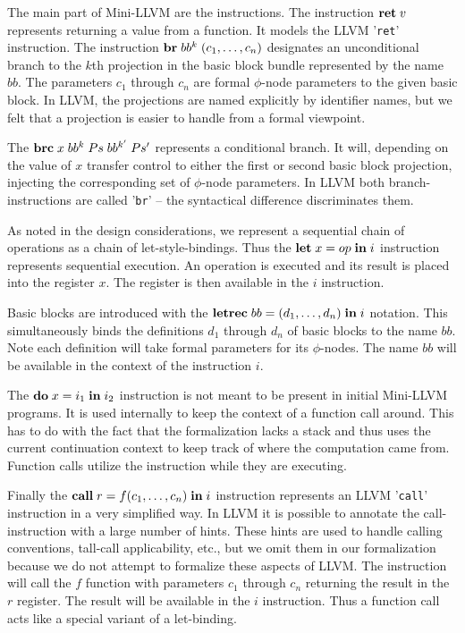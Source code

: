 \documentclass[a4paper, oneside, 10pt, draft]{memoir}
\begin{document}
The main part of Mini-LLVM are the instructions. The instruction
$\mathbf{ret} \; v$ represents returning a value from a function. It models the
LLVM '\texttt{ret}' instruction. The instruction $\mathbf{br} \; bb^k \; (c_1,
  \dotsc, c_n)$ designates an unconditional branch to the $k$th
projection in the basic block bundle represented by the name $bb$. The
parameters $c_1$ through $c_n$ are formal $\phi$-node parameters to
the given basic block. In LLVM, the projections are named explicitly
by identifier names, but we felt that a projection is easier to handle
from a formal viewpoint.

The $\mathbf{brc} \; x \; bb^k \; Ps \; bb^{k'} \; Ps'$ represents a conditional
branch. It will, depending on the value of $x$ transfer control to
either the first or second basic block projection, injecting the
corresponding set of $\phi$-node parameters. In LLVM both
branch-instructions are called '\texttt{br}' -- the syntactical
difference discriminates them.

As noted in the design considerations, we represent a sequential chain
of operations as a chain of let-style-bindings. Thus the
$\mathbf{let} \; x = op \; \mathbf{in} \; i$ instruction represents sequential execution. An
operation is executed and its result is placed into the register
$x$. The register is then available in the $i$ instruction.

Basic blocks are introduced with the $\mathbf{letrec} \; bb = (d_1, \dotsc,
  d_n) \; \mathbf{in} \; i$ notation. This simultaneously binds the definitions $d_1$
through $d_n$ of basic blocks to the name $bb$. Note each definition will
take formal parameters for its $\phi$-nodes. The name $bb$ will be
available in the context of the instruction $i$.

The $\mathbf{do} \; x = i_1 \; \mathbf{in} \; i_2$ instruction is not meant to be present in
initial Mini-LLVM programs. It is used internally to keep the context
of a function call around. This has to do with the fact that the
formalization lacks a stack and thus uses the current continuation
context to keep track of where the computation came from. Function
calls utilize the instruction while they are executing.

Finally the $\mathbf{call} \; r = f (c_1, \dotsc, c_n)\; \mathbf{in} \; i$ instruction
represents an LLVM '\texttt{call}' instruction in a very simplified
way. In LLVM it is possible to annotate the call-instruction with a
large number of hints. These hints are used to handle calling
conventions, tall-call applicability, etc., but we omit them in our
formalization because we do not attempt to formalize these aspects of
LLVM. The instruction will call the $f$ function with parameters $c_1$
through $c_n$ returning the result in the $r$ register. The result
will be available in the $i$ instruction. Thus a function call acts
like a special variant of a let-binding.
\end{document}
